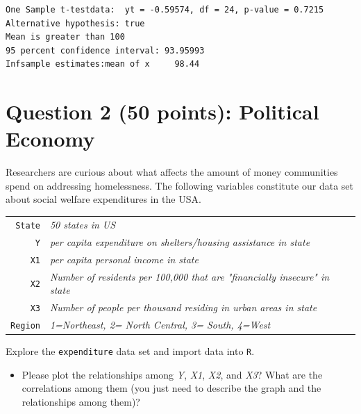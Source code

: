 \documentclass[12pt,letterpaper]{article}
\begin{document}

	\begin{verbatim}
One Sample t-testdata:  yt = -0.59574, df = 24, p-value = 0.7215
Alternative hypothesis: true
Mean is greater than 100
95 percent confidence interval: 93.95993      
Infsample estimates:mean of x     98.44 
\end{verbatim}


	
	\newpage
	
	\section*{Question 2 (50 points): Political Economy}
	
	\noindent Researchers are curious about what affects the amount of money communities spend on addressing homelessness. The following variables constitute our data set about social welfare expenditures in the USA. \\

	
	
	\begin{tabular}{r|l}
		\texttt{State} &\emph{50 states in US} \\
		\texttt{Y} & \emph{per capita expenditure on shelters/housing assistance in state}\\
		\texttt{X1} &\emph{per capita personal income in state} \\
		\texttt{X2} &  \emph{Number of residents per 100,000 that are "financially insecure" in state}\\
		\texttt{X3} &  \emph{Number of people per thousand residing in urban areas in state} \\
		\texttt{Region} &  \emph{1=Northeast, 2= North Central, 3= South, 4=West} \\
	\end{tabular}
	
	\vspace{.5cm}
	\noindent Explore the \texttt{expenditure} data set and import data into \texttt{R}.
	\vspace{.5cm}
	  
	\vspace{.5cm}
	\begin{itemize}
		\item
		Please plot the relationships among \emph{Y}, \emph{X1}, \emph{X2}, and \emph{X3}? What are the correlations among them (you just need to describe the graph and the relationships among them)?
		\end{itemize}
		
\end{document}
